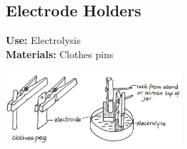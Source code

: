 \begin{multicols}{2}
%

\section{Electrode Holders}
\label{sec:electrode-holder}
\vspace{-10pt}
\textbf{Use:} Electrolysis\\
\textbf{Materials:} Clothes pins
\begin{center}
\includegraphics[width=0.49\textwidth]{./img/vso/electrode-holders.jpg}
\end{center}



\end{multicols}
